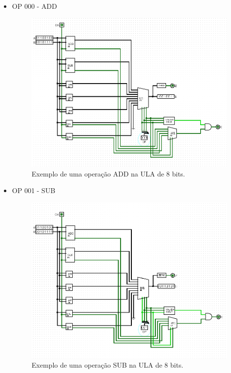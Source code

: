 \documentclass[
	12pt,				%
	openright,			%
	twoside,			%
	a4paper,			%
	english,			%
	french,				%
	spanish,			%
	brazil,				%
	]{abntex2}
\begin{document}
\begin{apendicesenv}
\begin{itemize}
\item {OP 000 - ADD}

\begin{figure}[H]
	\begin{center}
	    \includegraphics[scale=0.5]{alu8000add.png}
	\end{center}
\caption{\label{alu8000add}Exemplo de uma operação ADD na ULA de 8 bits.}
\end{figure}

\newpage
\item{OP 001 - SUB}

\begin{figure}[H]
	\begin{center}
	    \includegraphics[scale=0.5]{alu8001sub.png}
	\end{center}
\caption{\label{alu001sub}Exemplo de uma operação SUB na ULA de 8 bits.}
\end{figure}


\end{itemize}
\end{apendicesenv}
\end{document}
